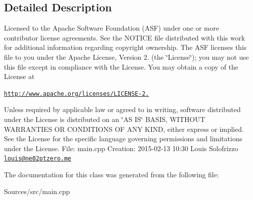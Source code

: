 \subsection{Detailed Description}
Licensed to the Apache Software Foundation (A\-S\-F) under one or more contributor license agreements. See the N\-O\-T\-I\-C\-E file distributed with this work for additional information regarding copyright ownership. The A\-S\-F licenses this file to you under the Apache License, Version 2. (the \char`\"{}\-License\char`\"{}); you may not use this file except in compliance with the License. You may obtain a copy of the License at

\href{http://www.apache.org/licenses/LICENSE-2.0}{\tt http\-://www.\-apache.\-org/licenses/\-L\-I\-C\-E\-N\-S\-E-\/2.}

Unless required by applicable law or agreed to in writing, software distributed under the License is distributed on an \char`\"{}\-A\-S I\-S\char`\"{} B\-A\-S\-I\-S, W\-I\-T\-H\-O\-U\-T W\-A\-R\-R\-A\-N\-T\-I\-E\-S O\-R C\-O\-N\-D\-I\-T\-I\-O\-N\-S O\-F A\-N\-Y K\-I\-N\-D, either express or implied. See the License for the specific language governing permissions and limitations under the License. File\-: main.\-cpp Creation\-: 2015-\/02-\/13 10\-:30 Louis Solofrizzo \href{mailto:louis@ne02ptzero.me}{\tt louis@ne02ptzero.\-me} 

The documentation for this class was generated from the following file\-:\begin{DoxyCompactItemize}
\item 
Sources/src/main.\-cpp\end{DoxyCompactItemize}
